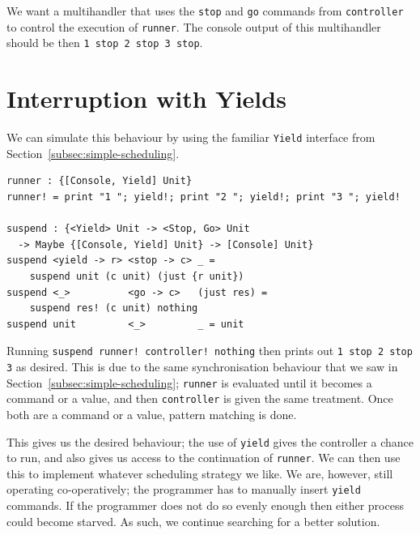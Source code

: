\documentclass[msc,deptreport,cs]{infthesis} %
\newcommand{\code}[1]{\lstinline{#1}}
\begin{document}
\noindent We want a multihandler that uses the \code{stop} and \code{go} commands from
\code{controller} to control the execution of \code{runner}. The console output
of this multihandler should be then \code{1 stop 2 stop 3 stop}.
%

\section{Interruption with Yields}
\label{sec:yield-interruption}


We can simulate this behaviour by using the familiar \code{Yield} interface from
Section~\ref{subsec:simple-scheduling}.

\begin{lstlisting}
runner : {[Console, Yield] Unit}
runner! = print "1 "; yield!; print "2 "; yield!; print "3 "; yield!

suspend : {<Yield> Unit -> <Stop, Go> Unit
  -> Maybe {[Console, Yield] Unit} -> [Console] Unit}
suspend <yield -> r> <stop -> c> _ =
    suspend unit (c unit) (just {r unit})
suspend <_>          <go -> c>   (just res) =
    suspend res! (c unit) nothing
suspend unit         <_>         _ = unit
\end{lstlisting}

\noindent Running \code{suspend runner! controller! nothing} then prints out
\code{1 stop 2 stop 3} as desired.
%
This is due to the same synchronisation behaviour that we saw in
Section~\ref{subsec:simple-scheduling}; \code{runner} is evaluated until it
becomes a command or a value, and then \code{controller} is given the same
treatment. Once both are a command or a value, pattern matching is done.

This gives us the desired behaviour; the use of \code{yield} gives the
controller a chance to run, and also gives us access to the continuation of
\code{runner}. We can then use this to implement whatever scheduling strategy we
like.
%
We are, however, still operating co-operatively; the programmer has to manually
insert \code{yield} commands. If the programmer does not do so evenly enough
then either process could become starved. As such, we continue searching for a
better solution.
\end{document}
